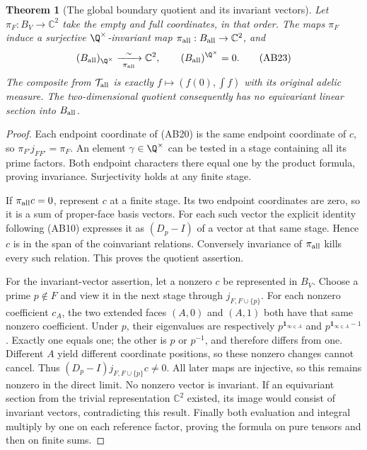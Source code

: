 \documentclass[11pt,a4paper]{article}
\newtheorem{theorem}{Theorem}[section]
\theoremstyle{definition}\newtheorem{definition}[theorem]{Definition}
\newcommand{\C}{\mathbb C}\newcommand{\R}{\mathbb R}
\begin{document}
\begin{theorem}[The global boundary quotient and its invariant vectors]
\label{thm:global-boundary}
Let $\pi_F:B_V\to\C^2$ take the empty and full coordinates, in that order.
The maps $\pi_F$ induce a surjective $\Q^\times$-invariant map
$\pi_{\rm all}:B_{\rm all}\to\C^2$, and
\[
 (B_{\rm all})_{\Q^\times}\xrightarrow[\ \pi_{\rm all}\ ]{\sim}\C^2,
 \qquad (B_{\rm all})^{\Q^\times}=0.
 \tag{AB23}
\]
The composite from $\mathcal T_{\rm all}$ is exactly
$f\mapsto(f(0),\int f)$ with its original adelic measure.
The two-dimensional quotient consequently has no equivariant linear
section into $B_{\rm all}$.
\end{theorem}
\begin{proof}
Each endpoint coordinate of (AB20) is the same endpoint coordinate of
$c$, so $\pi_{F'}j_{FF'}=\pi_F$. An element $\gamma\in\Q^\times$
can be tested in a stage containing all its prime factors. Both endpoint
characters there equal one by the product formula, proving invariance.
Surjectivity holds at any finite stage.

If $\pi_{\rm all}c=0$, represent $c$ at a finite stage. Its two endpoint
coordinates are zero, so it is a sum of proper-face basis vectors. For
each such vector the explicit identity following (AB10) expresses it as
$(D_p-I)$ of a vector at that same stage. Hence $c$ is in the span of
the coinvariant relations. Conversely invariance of $\pi_{\rm all}$
kills every such relation. This proves the quotient assertion.

For the invariant-vector assertion, let a nonzero $c$ be represented in
$B_V$. Choose a prime $p\notin F$ and view it in the next stage through
$j_{F,F\cup\{p\}}$. For each nonzero coefficient $c_A$, the two
extended faces $(A,0)$ and $(A,1)$ both have that same nonzero coefficient.
Under $p$, their eigenvalues are respectively
$p^{\mathbf1_{\infty\in A}}$ and
$p^{\mathbf1_{\infty\in A}-1}$. Exactly one equals one; the other is
$p$ or $p^{-1}$, and therefore differs from one. Different $A$ yield
different coordinate positions, so these nonzero changes cannot cancel.
Thus $(D_p-I)j_{F,F\cup\{p\}}c\ne0$. All later maps are injective, so
this remains nonzero in the direct limit. No nonzero vector is invariant.
If an equivariant section from the trivial representation $\C^2$ existed,
its image would consist of invariant vectors, contradicting this result.
Finally both evaluation and integral multiply by one on each reference
factor, proving the formula on pure tensors and then on finite sums.
\end{proof}
\end{document}
